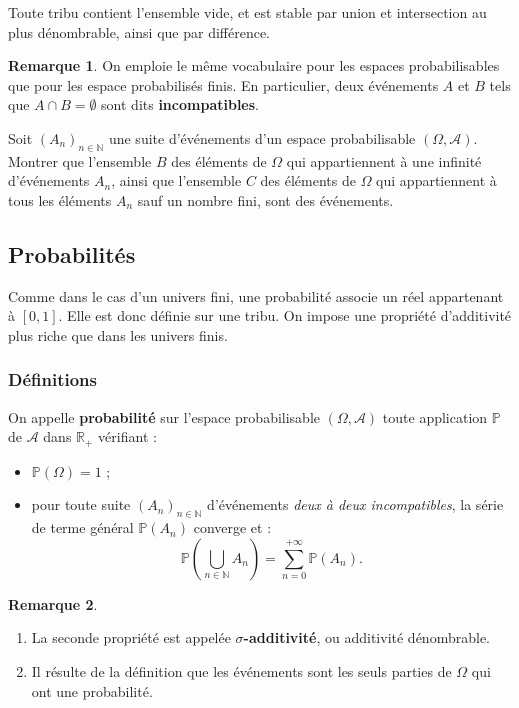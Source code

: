 \documentclass[french]{article}
\renewcommand{\P}{\mathbb{P}}
\newcommand{\N}{\mathbb{N}}
\newcommand{\R}{\mathbb{R}}
\theoremstyle{plain}
\theoremstyle{definition}
\newtheorem*{rmq}{Remarque}
\theoremstyle{remark}
\begin{document}
\begin{prop}%
	Toute tribu contient l'ensemble vide, et est stable par union et intersection au plus dénombrable, ainsi que par différence.
\end{prop}

\begin{rmq}
	On emploie le même vocabulaire pour les espaces probabilisables que pour les espace probabilisés finis. En particulier, deux événements $A$ et $B$ tels que $A\cap B=\emptyset$ sont dits \textbf{incompatibles}.
\end{rmq}

\begin{exo}
	Soit $(A_n)_{n\in\N}$ une suite d'événements d'un espace probabilisable $(\Omega,\mathcal{A})$. Montrer que l'ensemble $B$ des éléments de $\Omega$ qui appartiennent à une infinité d'événements $A_n$, ainsi que l'ensemble $C$ des éléments de $\Omega$ qui appartiennent à tous les éléments $A_n$ sauf un nombre fini, sont des événements.
\end{exo}

\subsection{Probabilités}

Comme dans le cas d'un univers fini, une probabilité associe un réel appartenant à $[0,1]$. Elle est donc définie sur une tribu. On impose une propriété d'additivité plus riche que dans les univers finis.

\subsubsection*{Définitions}

\begin{dfn}
	On appelle \textbf{probabilité} sur l'espace probabilisable $(\Omega,\mathcal{A})$ toute application $\P$ de $\mathcal{A}$ dans $\R_+$ vérifiant :
	\begin{itemize}
		\item $\P(\Omega)=1$ ;
		\item pour toute suite $(A_n)_{n\in\N}$ d'événements \textit{deux à deux incompatibles}, la série de terme général $\P(A_n)$ converge et :
		$$\P\left(\bigcup_{n\in\N}A_n\right)=\sum_{n=0}^{+\infty}\P(A_n).$$
	\end{itemize}
\end{dfn}

\begin{rmq}
	\begin{enumerate}
		\item La seconde propriété est appelée \textbf{$\sigma$-additivité}, ou additivité dénombrable.
		\item Il résulte de la définition que les événements sont les seuls parties de $\Omega$ qui ont une probabilité.
	\end{enumerate}
\end{rmq}
\end{document}
